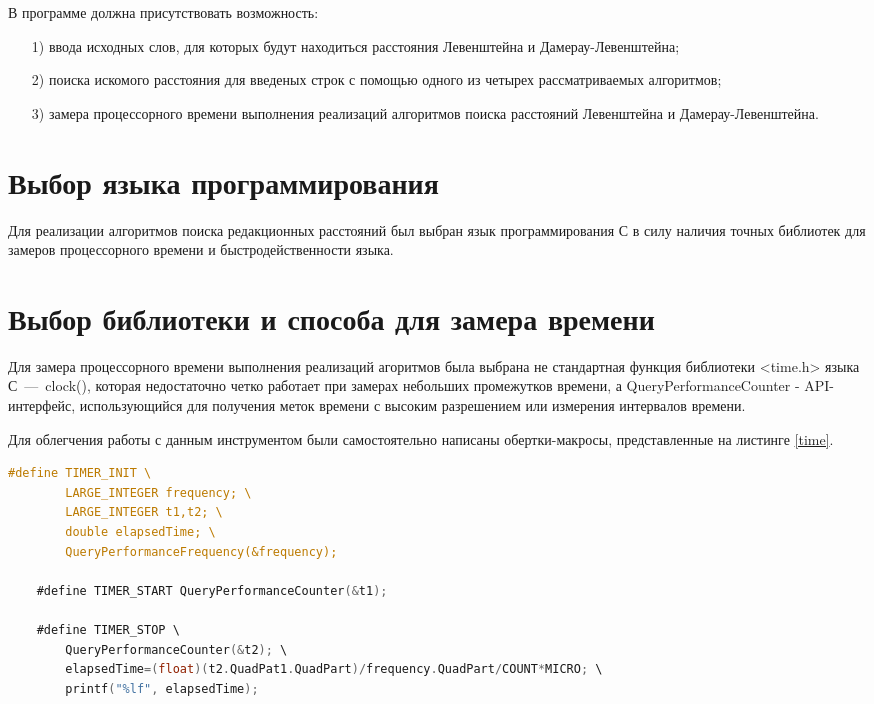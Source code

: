 \documentclass[a4paper,14pt, unknownkeysallowed]{extreport}
\begin{document}
	В программе должна присутствовать возможность:
	
	\begin{enumerate}
		\item[1)] ввода исходных слов, для которых будут находиться расстояния Левенштейна и Дамерау-Левенштейна;
		\item[2)] поиска искомого расстояния для введеных строк с помощью одного из четырех рассматриваемых алгоритмов;
		\item[3)] замера процессорного времени выполнения реализаций алгоритмов поиска расстояний Левенштейна и Дамерау-Левенштейна.
	\end{enumerate}
	
	\section{Выбор языка программирования}
	
	Для реализации алгоритмов поиска редакционных расстояний был выбран язык программирования С в силу наличия точных библиотек для замеров процессорного времени и быстродейственности языка.
	
	\section{Выбор библиотеки и способа для замера времени}
		Для замера процессорного времени выполнения реализаций агоритмов была выбрана не стандартная функция библиотеки <time.h> языка С~---~clock(), которая недостаточно четко работает при замерах небольших промежутков времени, а QueryPerformanceCounter - API-интерфейс, использующийся для получения меток времени с высоким разрешением или измерения интервалов времени.
        
        Для облегчения работы с данным инструментом были самостоятельно написаны обертки-макросы, представленные на листинге \ref{time}.
        
        \clearpage
        
        \begin{lstlisting}[label= time,caption=Листинг макросов, используемых для замеров процессорного времени,language=C]
    #define TIMER_INIT \
        LARGE_INTEGER frequency; \
        LARGE_INTEGER t1,t2; \
        double elapsedTime; \
        QueryPerformanceFrequency(&frequency);
            
    #define TIMER_START QueryPerformanceCounter(&t1);
            
    #define TIMER_STOP \
        QueryPerformanceCounter(&t2); \
        elapsedTime=(float)(t2.QuadPat1.QuadPart)/frequency.QuadPart/COUNT*MICRO; \
        printf("%lf", elapsedTime);
        \end{lstlisting}
		
\end{document}

